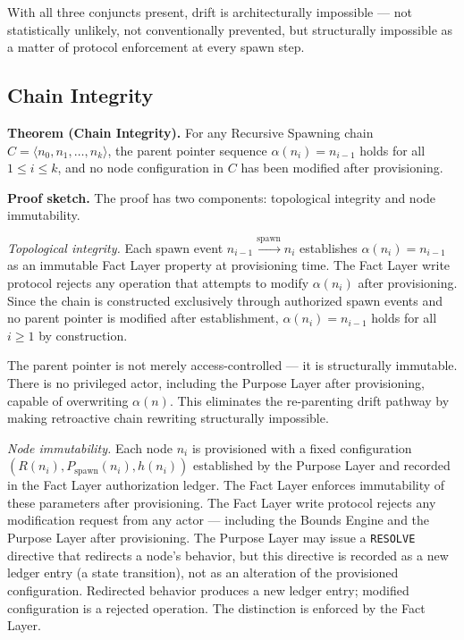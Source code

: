 With all three conjuncts present, drift is architecturally impossible — not statistically unlikely, not conventionally prevented, but structurally impossible as a matter of protocol enforcement at every spawn step.

\subsection{Chain Integrity}
\label{sec:rs-chain-integrity}

\medskip
\noindent\textbf{Theorem (Chain Integrity).} For any Recursive Spawning chain $C = \langle n_0, n_1, \ldots, n_k \rangle$, the parent pointer sequence $\alpha(n_i) = n_{i-1}$ holds for all $1 \leq i \leq k$, and no node configuration in $C$ has been modified after provisioning.

\medskip
\noindent\textbf{Proof sketch.} The proof has two components: topological integrity and node immutability.

\medskip
\textit{Topological integrity.} Each spawn event $n_{i-1} \xrightarrow{\mathrm{spawn}} n_i$ establishes $\alpha(n_i) = n_{i-1}$ as an immutable Fact Layer property at provisioning time. The Fact Layer write protocol rejects any operation that attempts to modify $\alpha(n_i)$ after provisioning. Since the chain is constructed exclusively through authorized spawn events and no parent pointer is modified after establishment, $\alpha(n_i) = n_{i-1}$ holds for all $i \geq 1$ by construction.

The parent pointer is not merely access-controlled — it is structurally immutable. There is no privileged actor, including the Purpose Layer after provisioning, capable of overwriting $\alpha(n)$. This eliminates the re-parenting drift pathway by making retroactive chain rewriting structurally impossible.

\medskip
\textit{Node immutability.} Each node $n_i$ is provisioned with a fixed configuration $(R(n_i), P_{\mathrm{spawn}}(n_i), h(n_i))$ established by the Purpose Layer and recorded in the Fact Layer authorization ledger. The Fact Layer enforces immutability of these parameters after provisioning. The Fact Layer write protocol rejects any modification request from any actor — including the Bounds Engine and the Purpose Layer after provisioning. The Purpose Layer may issue a \texttt{RESOLVE} directive that redirects a node's behavior, but this directive is recorded as a new ledger entry (a state transition), not as an alteration of the provisioned configuration. Redirected behavior produces a new ledger entry; modified configuration is a rejected operation. The distinction is enforced by the Fact Layer.

